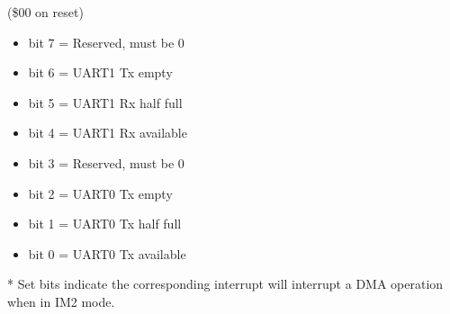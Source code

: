 (\$00 on reset)
\begin{itemize}
\item bit 7 = Reserved, must be 0
\item bit 6 = UART1 Tx empty
\item bit 5 = UART1 Rx half full
\item bit 4 = UART1 Rx available
\item bit 3 = Reserved, must be 0
\item bit 2 = UART0 Tx empty
\item bit 1 = UART0 Tx half full
\item bit 0 = UART0 Tx available
\end{itemize}
* Set bits indicate the corresponding interrupt will interrupt a DMA
  operation when in IM2 mode.
  
  
